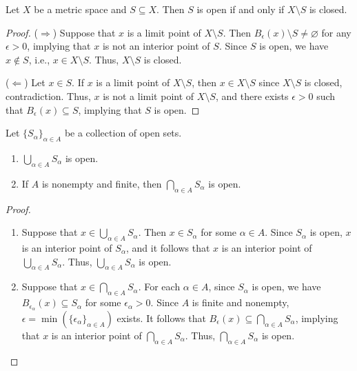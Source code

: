 \begin{theorem}
  \label{thm:open-versus-closed}
  Let $X$ be a metric space and $S \subseteq X$.
  Then $S$ is open if and only if $X \setminus S$ is closed.
\end{theorem}
\begin{proof}
  ($\Rightarrow$)
  Suppose that $x$ is a limit point of $X \setminus S$.
  Then $B_\epsilon(x) \setminus S \neq \varnothing$ for any $\epsilon > 0$,
  implying that $x$ is not an interior point of $S$.
  Since $S$ is open, we have $x \notin S$, i.e., $x \in X \setminus S$.
  Thus, $X \setminus S$ is closed.

  ($\Leftarrow$)
  Let $x \in S$.
  If $x$ is a limit point of $X \setminus S$, then $x \in X \setminus S$ since
  $X \setminus S$ is closed, contradiction.
  Thus, $x$ is not a limit point of $X \setminus S$, and there exists
  $\epsilon > 0$ such that $B_\epsilon(x) \subseteq S$, implying that $S$ is
  open.
\end{proof}

\begin{theorem}
  \label{thm:open-sets}
  Let $\{S_\alpha\}_{\alpha \in A}$ be a collection of open sets.
  \begin{enumerate}
    \item $\bigcup_{\alpha \in A} S_\alpha$ is open.
    \item If $A$ is nonempty and finite, then $\bigcap_{\alpha \in A} S_\alpha$
    is open.
  \end{enumerate}
\end{theorem}
\begin{proof}
  \leavevmode
  \begin{enumerate}
    \item Suppose that $x \in \bigcup_{\alpha \in A} S_\alpha$.
    Then $x \in S_\alpha$ for some $\alpha \in A$.
    Since $S_\alpha$ is open, $x$ is an interior point of $S_\alpha$, and it
    follows that $x$ is an interior point of $\bigcup_{\alpha \in A} S_\alpha$.
    Thus, $\bigcup_{\alpha \in A} S_\alpha$ is open.
    \item Suppose that $x \in \bigcap_{\alpha \in A} S_\alpha$.
    For each $\alpha \in A$, since $S_\alpha$ is open, we have
    $B_{\epsilon_\alpha}(x) \subseteq S_\alpha$ for some $\epsilon_\alpha > 0$.
    Since $A$ is finite and nonempty,
    $\epsilon = \min(\{\epsilon_\alpha\}_{\alpha \in A})$ exists.
    It follows that $B_\epsilon(x) \subseteq \bigcap_{\alpha \in A} S_\alpha$,
    implying that $x$ is an interior point of $\bigcap_{\alpha \in A}
    S_\alpha$.
    Thus, $\bigcap_{\alpha \in A} S_\alpha$ is open.
    \qedhere
  \end{enumerate}
\end{proof}

